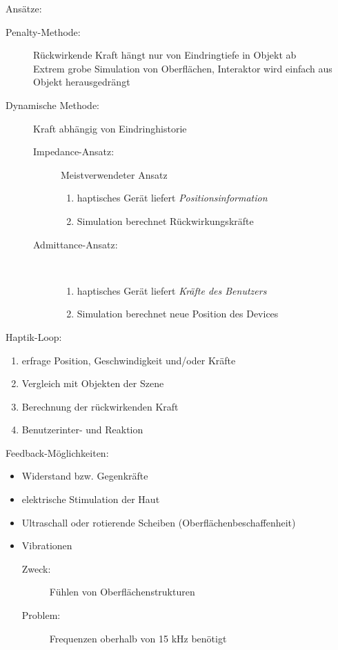 \documentclass[a4paper, 12pt]{article}
\begin{document}
Ansätze:
\begin{description}
  \item[Penalty-Methode:] Rückwirkende Kraft hängt nur von Eindringtiefe in Objekt ab\\
    Extrem grobe Simulation von Oberflächen, Interaktor wird einfach aus Objekt herausgedrängt
  \item[Dynamische Methode:] Kraft abhängig von Eindringhistorie
    \begin{description}
      \item[Impedance-Ansatz:] Meistverwendeter Ansatz
        \begin{enumerate}
          \item haptisches Gerät liefert \emph{Positionsinformation}
          \item Simulation berechnet Rückwirkungskräfte
        \end{enumerate}
      \item[Admittance-Ansatz:]~
        \begin{enumerate}
          \item haptisches Gerät liefert \emph{Kräfte des Benutzers}
          \item Simulation berechnet neue Position des Devices
        \end{enumerate}
    \end{description}
\end{description}
Haptik-Loop:
\begin{enumerate}
  \item erfrage Position, Geschwindigkeit und/oder Kräfte
  \item Vergleich mit Objekten der Szene
  \item Berechnung der rückwirkenden Kraft
  \item Benutzerinter- und Reaktion
\end{enumerate}
Feedback-Möglichkeiten:
\begin{itemize}
  \item Widerstand bzw. Gegenkräfte
  \item elektrische Stimulation der Haut
  \item Ultraschall oder rotierende Scheiben (Oberflächenbeschaffenheit)
  \item Vibrationen
    \begin{description}
      \item[Zweck:] Fühlen von Oberflächenstrukturen
      \item[Problem:] Frequenzen oberhalb von 15 kHz benötigt
    \end{description}
\end{itemize}
\end{document}
